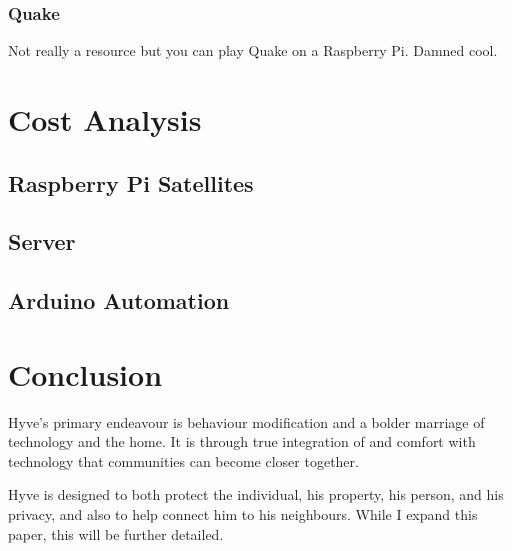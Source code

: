 \begin{multicols}{2}
		\subsubsection{Quake}
		
			Not really a resource but you can play Quake on a Raspberry Pi.
			Damned cool.
			
	\section{Cost Analysis}
	
		\subsection{Raspberry Pi Satellites}
		
		\subsection{Server}
		
		\subsection{Arduino Automation}
			
	\section{Conclusion}
	
		Hyve's primary endeavour is behaviour modification and a bolder marriage of technology and the home.
		It is through true integration of and comfort with technology that communities can become closer together.
		
		Hyve is designed to both protect the individual, his property, his person, and his privacy, and also to help connect him to his neighbours.
		While I expand this paper, this will be further detailed.

\end{multicols}
